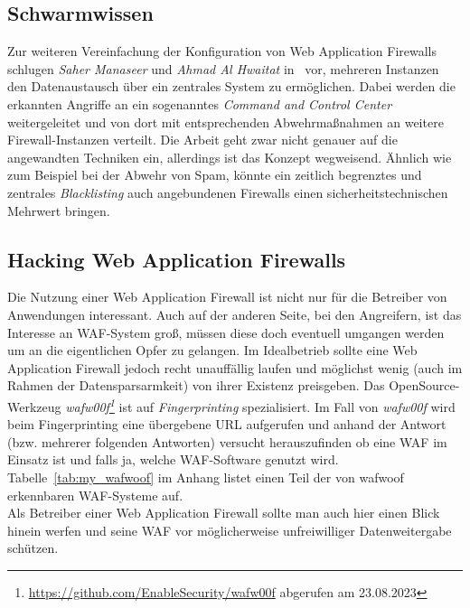 \subsection{Schwarmwissen}
Zur weiteren Vereinfachung der Konfiguration von Web Application Firewalls schlugen \emph{Saher Manaseer} und \emph{Ahmad Al Hwaitat} in~\cite{Manaseer2018} vor, mehreren Instanzen den Datenaustausch über ein zentrales System zu ermöglichen. Dabei werden die erkannten Angriffe an ein sogenanntes \emph{Command and Control Center} weitergeleitet und von dort mit entsprechenden Abwehrmaßnahmen an weitere Firewall-Instanzen verteilt. Die Arbeit geht zwar nicht genauer auf die angewandten Techniken ein, allerdings ist das Konzept wegweisend. Ähnlich wie zum Beispiel bei der Abwehr von Spam, könnte ein zeitlich begrenztes und zentrales \emph{Blacklisting} auch angebundenen Firewalls einen sicherheitstechnischen Mehrwert bringen.




\subsection{Hacking Web Application Firewalls}

Die Nutzung einer Web Application Firewall ist nicht nur für die Betreiber von Anwendungen interessant. Auch auf der anderen Seite, bei den Angreifern, ist das Interesse an WAF-System groß, müssen diese doch eventuell umgangen werden um an die eigentlichen Opfer zu gelangen. Im Idealbetrieb sollte eine Web Application Firewall jedoch recht unauffällig laufen und möglichst wenig (auch im Rahmen der Datensparsarmkeit) von ihrer Existenz preisgeben. Das OpenSource-Werkzeug \emph{wafw00f\footnote{\url{https://github.com/EnableSecurity/wafw00f} abgerufen am 23.08.2023}} ist auf \emph{Fingerprinting} spezialisiert. Im Fall von \emph{wafw00f} wird beim Fingerprinting eine übergebene URL aufgerufen und anhand der Antwort (bzw. mehrerer folgenden Antworten) versucht herauszufinden ob eine WAF im Einsatz ist und falls ja, welche WAF-Software genutzt wird.\\ Tabelle~\ref{tab:my_wafwoof} im Anhang listet einen Teil der von wafwoof erkennbaren WAF-Systeme auf.\\ Als Betreiber einer Web Application Firewall sollte man auch hier einen Blick hinein werfen und seine WAF vor möglicherweise unfreiwilliger Datenweitergabe schützen. 

